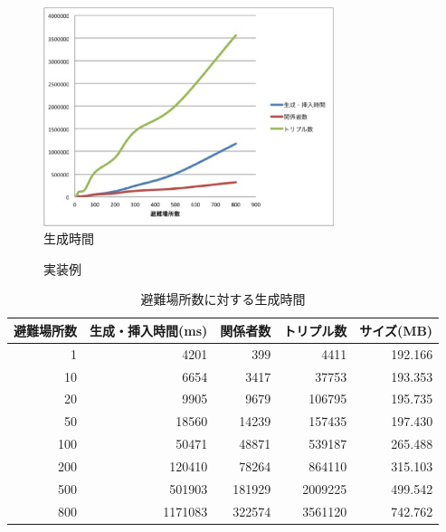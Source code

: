 \begin{figure}[h!]
 	\begin{center}
 		\includegraphics[width=85mm]{./images/sibm_tdb_time.eps}
 		\caption{生成時間}
 		\label{fig:sibm_data_time}
 	\end{center}
\end{figure}

\begin{figure}[h!]
\begin{center}
	
  	\caption{実装例}
  	\label{fig:sibm_sample}
\end{center}
\end{figure}

\begin{table}[h]
	\begin{center}
	\begin{tabular}{| r | r | r | r | r |}
		\hline
		\rowstyle{\bfseries}
		避難場所数 & 生成・挿入時間(ms) & 関係者数 & トリプル数 & サイズ(MB) \\
		\hline
		1 & 4201 & 399 & 4411 & 192.166 \\
		\hline
		10 & 6654 & 3417 & 37753 & 193.353 \\
		\hline
		20 & 9905 & 9679 & 106795 & 195.735 \\
		\hline
		50 & 18560 & 14239 & 157435 & 197.430 \\
		\hline
		100 & 50471 & 48871 & 539187 & 265.488 \\
		\hline
		200 & 120410 & 78264 & 864110 & 315.103 \\
		\hline
		500 & 501903 & 181929 & 2009225 & 499.542 \\
		\hline
		800 & 1171083 & 322574 & 3561120 & 742.762 \\
		\hline
	\end{tabular}
	\caption{避難場所数に対する生成時間}
	\label{table:sibm_time_table}
	\end{center}
\end{table}


